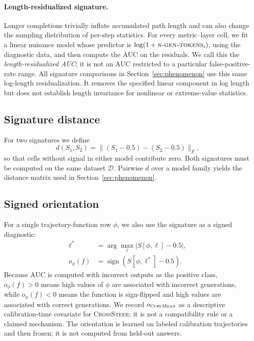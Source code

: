 \paragraph{Length-residualized signature.}
Longer completions trivially inflate accumulated path length and can also change
the sampling distribution of per-step statistics. For every metric--layer cell,
we fit a linear nuisance model whose predictor is
$\log(1+\textsc{n-gen-tokens}_i)$, using the diagnostic data, and then compute
the AUC on the residuals. We call this the \emph{length-residualized AUC}; it is
not an AUC restricted to a particular false-positive-rate range. All signature
comparisons in Section~\ref{sec:phenomenon} use this same log-length
residualization. It removes the specified linear component in log length but
does not establish length invariance for nonlinear or extreme-value statistics.

\subsection{Signature distance}
For two signatures we define
\begin{equation}
\label{eq:signature-distance}
  d(S_1, S_2) = \lVert (S_1 - 0.5) - (S_2 - 0.5)\rVert_F,
\end{equation}
so that cells without signal in either model contribute zero. Both signatures must
be computed on the same dataset $\mathcal{D}$. Pairwise $d$ over a model family
yields the distance matrix used in Section~\ref{sec:phenomenon}.

\subsection{Signed orientation}
\label{sec:signed-orientation}

For a single trajectory-function row $\phi$, we also use the signature as a signed diagnostic:
\begin{equation}
\label{eq:signed-orientation}
\begin{split}
\ell^* &= \arg\max_\ell |S[\phi,\ell]-0.5|,\\
o_\phi(f) &= \operatorname{sign}\!\left(S[\phi,\ell^*]-0.5\right).
\end{split}
\end{equation}
Because AUC is computed with incorrect outputs as the positive class,
$o_\phi(f)>0$ means high values of $\phi$ are associated with incorrect generations, while
$o_\phi(f)<0$ means the function is sign-flipped and high values are associated with
correct generations. We record $o_{\textsc{CurvMean}}$ as a descriptive
calibration-time covariate for \textsc{CrossSteer}; it is not a compatibility
rule or a claimed mechanism.  The orientation is learned on labeled calibration
trajectories and then frozen; it is not computed from held-out answers.

